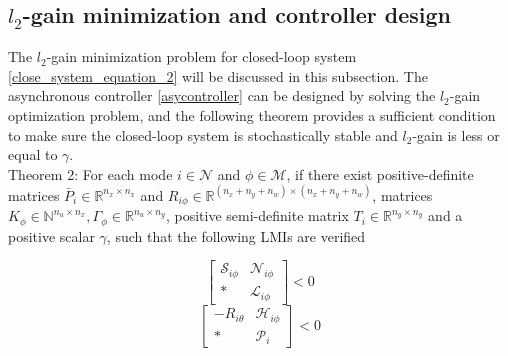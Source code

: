 \documentclass[conference]{IEEEtran}
\begin{document}
\subsection{$l_2$-gain minimization and controller design}
The $l_2$-gain minimization problem for closed-loop system \eqref{close_system_equation_2} will be discussed in this subsection. The asynchronous controller \eqref{asycontroller} can be designed by solving the $l_2$-gain optimization problem, and the following theorem provides a sufficient condition to make sure the closed-loop system is stochastically stable and $l_2$-gain is less or equal to $\gamma$.\\
Theorem 2: For each mode $i\in\mathcal{N}$ and $\phi\in\mathcal{M}$, if there exist positive-definite matrices $\bar{P}_{i}\in\mathbb{R}^{n_x\times n_x}$ and $R_{i\phi}\in \mathbb{R}^{(n_x+n_y+n_w)\times(n_x+n_y+n_w)}$, matrices $K_{\phi}\in\mathbb{N}^{n_u\times n_x}, \varGamma_{\phi}\in \mathbb{R}^{n_u\times n_y}$, positive semi-definite matrix $T_{i}\in\mathbb{R}^{n_y\times n_y}$ and a positive scalar $\gamma$, such that the following LMIs are verified

\begin{equation} \label{condition_2_2}
	\begin{bmatrix}
		\mathscr{S}_{i\phi}&\mathscr{N}_{i\phi}\\
		*&\mathscr{L}_{i\phi}
	\end{bmatrix}<0
\end{equation}
\begin{equation} \label{condition_2_1}
	\begin{bmatrix}
	-R_{i\theta}&\mathscr{H}_{i\phi}\\
	*&\mathscr{P}_{i}
	\end{bmatrix}<0
\end{equation}

\end{document}
